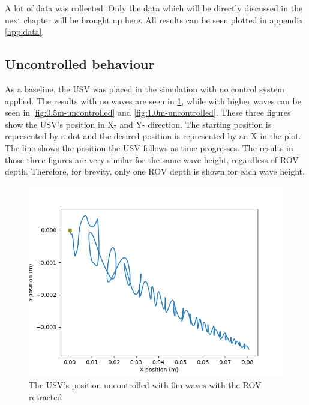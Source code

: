 \documentclass[class=article, crop=false]{standalone}
\begin{document}
A lot of data was collected. Only the data which will be directly discussed in the next chapter will be brought up here. All results can be seen plotted in appendix \ref{app:data}.

\subsection{Uncontrolled behaviour}
As a baseline, the USV was placed in the simulation with no control system applied. The results with no waves are seen in \cref{fig:0-uncontrolled}, while with higher waves can be seen in \cref{fig:0.5m-uncontrolled} and \cref{fig:1.0m-uncontrolled}. These three figures show the USV's position in X- and Y- direction. The starting position is represented by a dot and the desired position is represented by an X in the plot. The line shows the position the USV follows as time progresses. The results in those three figures are very similar for the same wave height, regardless of ROV depth. Therefore, for brevity, only one ROV depth is shown for each wave height.

\begin{figure}
    \centering
    \includegraphics{scenario1/rov-0m/0.0m/usv_position_uncontrolled}
    \caption{The USV's position uncontrolled with 0m waves with the ROV retracted}
    \label{fig:0-uncontrolled}
\end{figure}
\end{document}
